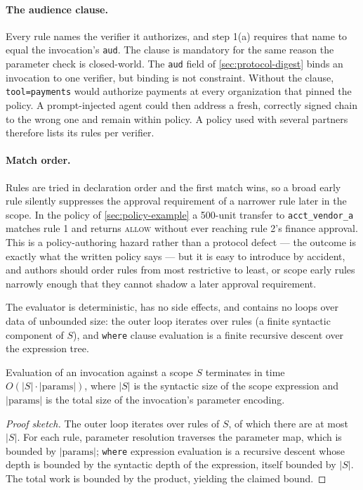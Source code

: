 \documentclass[11pt,a4paper]{article}
\begin{document}
\paragraph{The audience clause.}
Every rule names the verifier it authorizes, and step 1(a) requires that
name to equal the invocation's \texttt{aud}. The clause is mandatory for
the same reason the parameter check is closed-world. The \texttt{aud}
field of \cref{sec:protocol-digest} binds an invocation to one verifier,
but binding is not constraint. Without the clause, \texttt{tool=payments}
would authorize payments at every organization that pinned the policy.
A prompt-injected agent could then address a fresh, correctly signed
chain to the wrong one and remain within policy. A policy used with
several partners therefore lists its rules per verifier.

\paragraph{Match order.}
Rules are tried in declaration order and the first match wins, so a
broad early rule silently suppresses the approval requirement of a
narrower rule later in the scope. In the policy of
\cref{sec:policy-example} a 500-unit transfer to
\texttt{acct\_vendor\_a} matches rule 1 and returns \textsc{allow}
without ever reaching rule 2's finance approval. This is a
policy-authoring hazard rather than a protocol defect --- the outcome is
exactly what the written policy says --- but it is easy to introduce by
accident, and authors should order rules from most restrictive to least,
or scope early rules narrowly enough that they cannot shadow a later
approval requirement.

The evaluator is deterministic, has no side effects, and contains no
loops over data of unbounded size: the outer loop iterates over rules
(a finite syntactic component of $S$), and \texttt{where} clause
evaluation is a finite recursive descent over the expression tree.

\begin{proposition}[Termination]
\label{prop:termination}
Evaluation of an invocation against a scope $S$ terminates in time
$O(|S| \cdot |\text{params}|)$, where $|S|$ is the syntactic size of the
scope expression and $|\text{params}|$ is the total size of the
invocation's parameter encoding.
\end{proposition}

\begin{proof}[Proof sketch]
The outer loop iterates over rules of $S$, of which there are at most
$|S|$. For each rule, parameter resolution traverses the parameter map,
which is bounded by $|\text{params}|$; \texttt{where} expression
evaluation is a recursive descent whose depth is bounded by the
syntactic depth of the expression, itself bounded by $|S|$. The total
work is bounded by the product, yielding the claimed bound.
\end{proof}
\end{document}
